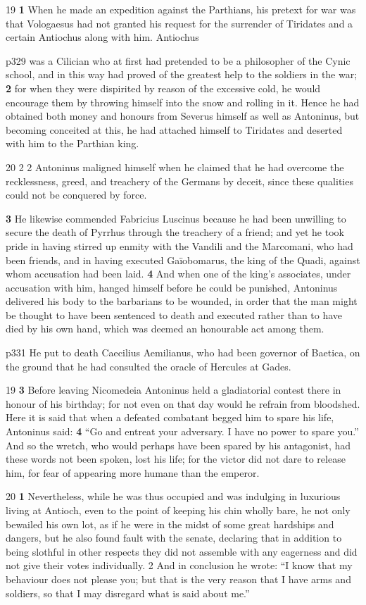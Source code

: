19
\textbf{1} When he made an expedition against the Parthians, his pretext for war was that Vologaesus had not granted his request for the surrender of Tiridates and a certain Antiochus along with him. Antiochus

p329 was a Cilician who at first had pretended to be a philosopher of the Cynic school, and in this way had proved of the greatest help to the soldiers in the war; \textbf{2} for when they were dispirited by reason of the excessive cold, he would encourage them by throwing himself into the snow and rolling in it. Hence he had obtained both money and honours from Severus himself as well as Antoninus, but becoming conceited at this, he had attached himself to Tiridates and deserted with him to the Parthian king.

20
2 2 Antoninus maligned himself when he claimed that he had overcome the recklessness, greed, and treachery of the Germans by deceit, since these qualities could not be conquered by force.

\textbf{3} He likewise commended Fabricius Luscinus because he had been unwilling to secure the death of Pyrrhus through the treachery of a friend; and yet he took pride in having stirred up enmity with the Vandili and the Marcomani, who had been friends, and in having executed Gaïobomarus, the king of the Quadi, against whom accusation had been laid. \textbf{4} And when one of the king's associates, under accusation with him, hanged himself before he could be punished, Antoninus delivered his body to the barbarians to be wounded, in order that the man might be thought to have been sentenced to death and executed rather than to have died by his own hand, which was deemed an honourable act among them.

p331
He put to death Caecilius Aemilianus, who had been governor of Baetica, on the ground that he had consulted the oracle of Hercules at Gades.

19 \textbf{3}
Before leaving Nicomedeia Antoninus held a gladiatorial contest there in honour of his birthday; for not even on that day would he refrain from bloodshed. Here it is said that when a defeated combatant begged him to spare his life, Antoninus said: \textbf{4} ``Go and entreat your adversary. I have no power to spare you.'' And so the wretch, who would perhaps have been spared by his antagonist, had these words not been spoken, lost his life; for the victor did not dare to release him, for fear of appearing more humane than the emperor.

20
\textbf{1} Nevertheless, while he was thus occupied and was indulging in luxurious living at Antioch, even to the point of keeping his chin wholly bare, he not only bewailed his own lot, as if he were in the midst of some great hardships and dangers, but he also found fault with the senate, declaring that in addition to being slothful in other respects they did not assemble with any eagerness and did not give their votes individually. 2 And in conclusion he wrote: ``I know that my behaviour does not please you; but that is the very reason that I have arms and soldiers, so that I may disregard what is said about me.''

